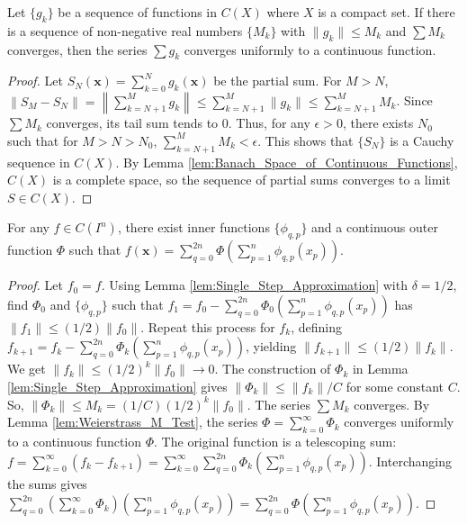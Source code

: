 \begin{lemma}
    \label{lem:Weierstrass_M_Test}
    Let $\{g_k\}$ be a sequence of functions in $C(X)$ where $X$ is a compact set. If there is a sequence of non-negative real numbers $\{M_k\}$ with $\|g_k\| \le M_k$ and $\sum M_k$ converges, then the series $\sum g_k$ converges uniformly to a continuous function.
\end{lemma}

\begin{proof}
    Let $S_N(\mathbf{x}) = \sum_{k=0}^N g_k(\mathbf{x})$ be the partial sum. For $M > N$, $\|S_M - S_N\| = \left\|\sum_{k=N+1}^M g_k\right\| \le \sum_{k=N+1}^M \|g_k\| \le \sum_{k=N+1}^M M_k$. Since $\sum M_k$ converges, its tail sum tends to 0. Thus, for any $\epsilon > 0$, there exists $N_0$ such that for $M > N > N_0$, $\sum_{k=N+1}^M M_k < \epsilon$. This shows that $\{S_N\}$ is a Cauchy sequence in $C(X)$. By Lemma \ref{lem:Banach_Space_of_Continuous_Functions}, $C(X)$ is a complete space, so the sequence of partial sums converges to a limit $S \in C(X)$.
\end{proof}

\begin{lemma}
    \label{lem:Iterative_Refinement}
    For any $f \in C(I^n)$, there exist inner functions $\{\phi_{q,p}\}$ and a continuous outer function $\Phi$ such that $f(\mathbf{x}) = \sum_{q=0}^{2n} \Phi\left(\sum_{p=1}^n \phi_{q,p}(x_p)\right)$.
\end{lemma}

\begin{proof}
    Let $f_0 = f$. Using Lemma \ref{lem:Single_Step_Approximation} with $\delta=1/2$, find $\Phi_0$ and $\{\phi_{q,p}\}$ such that $f_1 = f_0 - \sum_{q=0}^{2n} \Phi_0\left(\sum_{p=1}^n \phi_{q,p}(x_p)\right)$ has $\|f_1\| \le (1/2)\|f_0\|$. Repeat this process for $f_k$, defining $f_{k+1} = f_k - \sum_{q=0}^{2n} \Phi_k\left(\sum_{p=1}^n \phi_{q,p}(x_p)\right)$, yielding $\|f_{k+1}\| \le (1/2)\|f_k\|$. We get $\|f_k\| \le (1/2)^k \|f_0\| \to 0$.
    The construction of $\Phi_k$ in Lemma \ref{lem:Single_Step_Approximation} gives $\|\Phi_k\| \le \|f_k\|/C$ for some constant $C$. So, $\|\Phi_k\| \le M_k = (1/C)(1/2)^k \|f_0\|$. The series $\sum M_k$ converges. By Lemma \ref{lem:Weierstrass_M_Test}, the series $\Phi = \sum_{k=0}^{\infty} \Phi_k$ converges uniformly to a continuous function $\Phi$.
    The original function is a telescoping sum: $f = \sum_{k=0}^{\infty} (f_k - f_{k+1}) = \sum_{k=0}^{\infty} \sum_{q=0}^{2n} \Phi_k\left(\sum_{p=1}^n \phi_{q,p}(x_p)\right)$. Interchanging the sums gives $\sum_{q=0}^{2n} \left(\sum_{k=0}^{\infty} \Phi_k\right)\left(\sum_{p=1}^n \phi_{q,p}(x_p)\right) = \sum_{q=0}^{2n} \Phi\left(\sum_{p=1}^n \phi_{q,p}(x_p)\right)$.
\end{proof}

